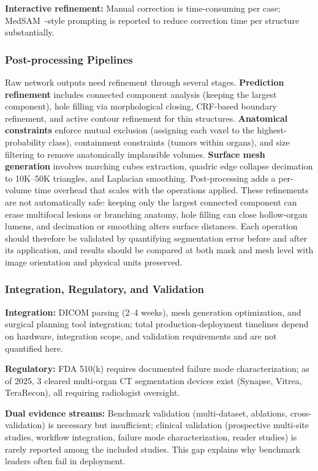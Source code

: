 \textbf{Interactive refinement:} Manual correction is time-consuming per case; MedSAM~\cite{ma2024medsam}-style prompting is reported to reduce correction time per structure substantially.

\subsubsection{Post-processing Pipelines}
\label{sec:postprocessing}

Raw network outputs need refinement through several stages. \textbf{Prediction refinement} includes connected component analysis (keeping the largest component), hole filling via morphological closing, CRF-based boundary refinement, and active contour refinement for thin structures. \textbf{Anatomical constraints} enforce mutual exclusion (assigning each voxel to the highest-probability class), containment constraints (tumors within organs), and size filtering to remove anatomically implausible volumes. \textbf{Surface mesh generation} involves marching cubes extraction, quadric edge collapse decimation to 10K--50K triangles, and Laplacian smoothing. Post-processing adds a per-volume time overhead that scales with the operations applied. These refinements are not automatically safe: keeping only the largest connected component can erase multifocal lesions or branching anatomy, hole filling can close hollow-organ lumens, and decimation or smoothing alters surface distances. Each operation should therefore be validated by quantifying segmentation error before and after its application, and results should be compared at both mask and mesh level with image orientation and physical units preserved.

\subsubsection{Integration, Regulatory, and Validation}

\textbf{Integration:} DICOM parsing (2--4 weeks), mesh generation optimization, and surgical planning tool integration; total production-deployment timelines depend on hardware, integration scope, and validation requirements and are not quantified here.

\textbf{Regulatory:} FDA 510(k) requires documented failure mode characterization; as of 2025, 3 cleared multi-organ CT segmentation devices exist (Synapse, Vitrea, TeraRecon), all requiring radiologist oversight.

\textbf{Dual evidence streams:} Benchmark validation (multi-dataset, ablations, cross-validation) is necessary but insufficient; clinical validation (prospective multi-site studies, workflow integration, failure mode characterization, reader studies) is rarely reported among the included studies. This gap explains why benchmark leaders often fail in deployment.

